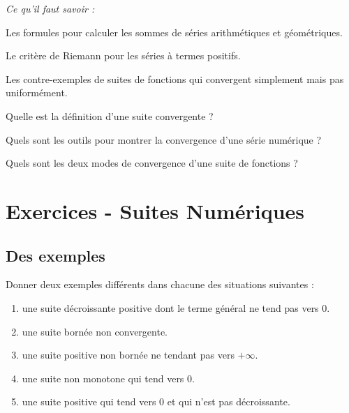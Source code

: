 
\begin{resumeBox}
  \emph{Ce qu'il faut savoir :} 
  \begin{niceitemize}
    \item Les formules pour calculer les sommes de séries arithmétiques et géométriques.
    \item Le critère de Riemann pour les séries à termes positifs.
    \item Les contre-exemples de suites de fonctions qui convergent simplement mais pas uniformément. 
  \end{niceitemize}
\end{resumeBox}
\begin{rappelsBox}
  \begin{niceitemize}
    \item Quelle est la définition d'une suite convergente ?
    \item Quels sont les outils pour montrer la convergence d'une série numérique ? 
    \item Quels sont les deux modes de convergence d'une suite de fonctions ?
  \end{niceitemize}
\end{rappelsBox}

\section*{Exercices - Suites Numériques}

\vspace{1em}

\subsection{Des exemples}
Donner deux exemples différents dans chacune des situations suivantes :
\begin{enumerate}[label = $\square$]
  \item une suite décroissante positive dont le terme général ne tend pas vers $0$.
  \item une suite bornée non convergente.
  \item une suite positive non bornée ne tendant pas vers $+\infty$.
  \item une suite non monotone qui tend vers $0$.
  \item une suite positive qui tend vers $0$ et qui n'est pas décroissante.
\end{enumerate}

